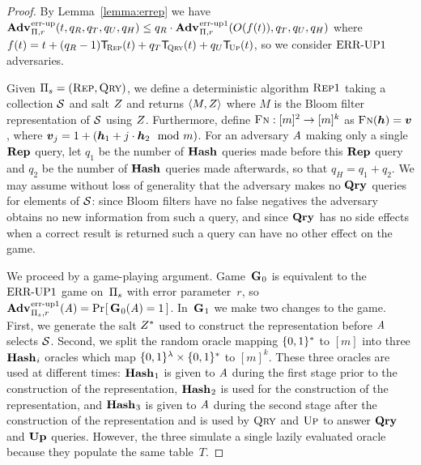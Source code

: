 \begin{proof} By Lemma~\ref{lemma:errep} we have $\Adv{\errep}_{\struct,r}(t, q_R, q_T, q_U, q_H) \leq q_R\cdot\Adv{\errep1}_{\struct,r}(O(f(t)), q_T, q_U, q_H)$ where $f(t) = t + (q_R-1)\ticks(\Rep,t) + q_T\ticks(\Qry,t) + q_U\ticks(\Up,t)$, so we consider $\textnormal{ERR\mbox{-}UP}1$ adversaries.

Given $\mathrm{\Pi}_s = (\textsc{Rep}, \textsc{Qry})$, we define a deterministic algorithm $\textsc{Rep}1$ taking a collection $\mathcal{S}$ and salt $Z$ and returns $\langle M, Z\rangle$ where $M$ is the Bloom filter representation of $\mathcal{S}$ using $Z$. Furthermore, define $\textsc{Fn}: [m]^2 \to [m]^k$ as $\fff(\hh) = \vv$, where $\vv_j = 1 + (\hh_1 + j \cdot \hh_2 \mod m)$. For an adversary $\mathit{A}$ making only a single $\mathbf{Rep}\hspace{0.5pt}$ query, let $q_1$ be the number of $\mathbf{Hash}\hspace{0.5pt}$ queries made before this $\mathbf{Rep}\hspace{0.5pt}$ query and $q_2$ be the number of $\mathbf{Hash}\hspace{0.5pt}$ queries made afterwards, so that $q_H = q_1 + q_2$. We may assume without loss of generality that the adversary makes no $\mathbf{Qry}\hspace{0.5pt}$ queries for elements of $\mathcal{S}$: since Bloom filters have no false negatives the adversary obtains no new information from such a query, and since $\mathbf{Qry}\hspace{0.5pt}$ has no side effects when a correct result is returned such a query can have no other effect on the game.

We proceed by a game-playing argument. Game~$\mathbf{G}\hspace{0.5pt}_0$ is equivalent to the $\textnormal{ERR\mbox{-}UP}1$ game on~$\mathrm{\Pi}_s$ with error parameter~$r$, so $\Adv{\errep1}_{\struct_s,r}(\advA) = \Prob{\G_0(\advA) = 1}$. In~$\mathbf{G}\hspace{0.5pt}_1$ we make two changes to the game. First, we generate the salt $Z^*$ used to construct the representation before $\mathit{A}$ selects $\mathcal{S}$. Second, we split the random oracle mapping $\{0,1\}^*$ to $[m]$ into three $\mathbf{Hash}\hspace{0.5pt}_i$ oracles which map $\{0,1\}^\lambda \times \{0,1\}^*$ to $[m]^k$. These three oracles are used at different times: $\mathbf{Hash}\hspace{0.5pt}_1$ is given to $\mathit{A}$ during the first stage prior to the construction of the representation, $\mathbf{Hash}\hspace{0.5pt}_2$ is used for the construction of the representation, and $\mathbf{Hash}\hspace{0.5pt}_3$ is given to $\mathit{A}$ during the second stage after the construction of the representation and is used by $\textsc{Qry}$ and $\textsc{Up}$ to answer $\mathbf{Qry}\hspace{0.5pt}$ and $\mathbf{Up}\hspace{0.5pt}$ queries. However, the three simulate a single lazily evaluated oracle because they populate the same table~$T$.


\end{proof}
